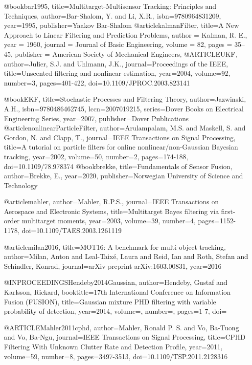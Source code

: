 @book{bar1995,
title={Multitarget-{M}ultisensor {T}racking: Principles and Techniques},
author={Bar-Shalom, Y. and Li, X.R.},
isbn={9780964831209},
year={1995},
publisher={Yaakov Bar-Shalom}
}
@article{kalmanFilter,
title={A {N}ew {A}pproach to {L}inear {F}iltering and {P}rediction {P}roblems},
author = {Kalman, R. E.},
year = {1960},
journal = {Journal of Basic Engineering},
volume = {82},
pages = {35--45},
publisher = {American Society of Mechanical Engineers},
}
@ARTICLE{UKF,
author={Julier, S.J. and Uhlmann, J.K.},
journal={Proceedings of the IEEE},
title={Unscented filtering and nonlinear estimation},
year={2004},
volume={92},
number={3},
pages={401-422},
doi={10.1109/JPROC.2003.823141}}

@book{EKF,
title={Stochastic Processes and Filtering Theory},
author={Jazwinski, A.H.},
isbn={9780486462745},
lccn={2007019215},
series={Dover Books on Electrical Engineering Series},
year={2007},
publisher={Dover Publications}
}
@article{nonlinearParticleFilter,
author={Arulampalam, M.S. and Maskell, S. and Gordon, N. and Clapp, T.},
journal={IEEE Transactions on Signal Processing},
title={A tutorial on particle filters for online nonlinear/non-{G}aussian {B}ayesian tracking},
year={2002},
volume={50},
number={2},
pages={174-188},
doi={10.1109/78.978374}
}
@book{brekke,
title={Fundamentals of Sensor Fusion},
author={Brekke, E.},
year={2020},
publisher={Norwegian University of Science and Technology}
}

@article{mahler,
author={Mahler, R.P.S.},
journal={IEEE Transactions on Aerospace and Electronic Systems},
title={Multitarget {B}ayes filtering via first-order multitarget moments},
year={2003},
volume={39},
number={4},
pages={1152-1178},
doi={10.1109/TAES.2003.1261119}
}

@article{milan2016,
title={MOT16: A benchmark for multi-object tracking},
author={Milan, Anton and Leal-Taix{\'e}, Laura and Reid, Ian and Roth, Stefan and Schindler, Konrad},
journal={arXiv preprint arXiv:1603.00831},
year={2016}
}

@INPROCEEDINGS{Hendeby2014Gaussian,
author={Hendeby, Gustaf and Karlsson, Rickard},
booktitle={17th International Conference on Information Fusion (FUSION)},
title={Gaussian mixture {PHD} filtering with variable probability of detection},
year={2014},
volume={},
number={},
pages={1-7},
doi={}
}

@ARTICLE{Mahler2011cphd,
author={Mahler, Ronald P. S. and Vo, Ba-Tuong and Vo, Ba-Ngu},
journal={IEEE Transactions on Signal Processing},
title={{CPHD} Filtering With Unknown Clutter Rate and Detection Profile},
year={2011},
volume={59},
number={8},
pages={3497-3513},
doi={10.1109/TSP.2011.2128316}
}

